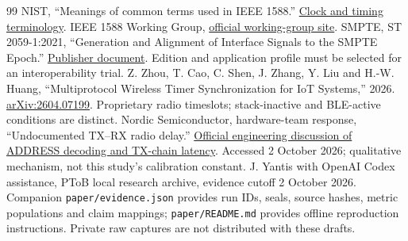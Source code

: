 \documentclass[11pt,letterpaper]{article}
\begin{document}
\begin{thebibliography}{99}
 NIST, ``Meanings of common terms used in IEEE 1588.'' \href{https://www.nist.gov/el/intelligent-systems-division-73500/meanings-common-terms-used-ieee-1588}{Clock and timing terminology}. IEEE 1588 Working Group, \href{https://sagroups.ieee.org/1588/}{official working-group site}.
 SMPTE, ST 2059-1:2021, ``Generation and Alignment of Interface Signals to the SMPTE Epoch.'' \href{https://pub.smpte.org/pub/st2059-1/st2059-1-2021.pdf}{Publisher document}. Edition and application profile must be selected for an interoperability trial.
 Z. Zhou, T. Cao, C. Shen, J. Zhang, Y. Liu and H.-W. Huang, ``Multiprotocol Wireless Timer Synchronization for IoT Systems,'' 2026. \href{https://doi.org/10.48550/arXiv.2604.07199}{arXiv:2604.07199}. Proprietary radio timeslots; stack-inactive and BLE-active conditions are distinct.
 Nordic Semiconductor, hardware-team response, ``Undocumented TX--RX radio delay.'' \href{https://devzone.nordicsemi.com/f/nordic-q-a/83778/undocumented-tx---rx-radio-delay/570863}{Official engineering discussion of ADDRESS decoding and TX-chain latency}. Accessed 2 October 2026; qualitative mechanism, not this study's calibration constant.
 J. Yantis with OpenAI Codex assistance, PToB local research archive, evidence cutoff 2 October 2026. Companion \texttt{paper/evidence.json} provides run IDs, seals, source hashes, metric populations and claim mappings; \texttt{paper/README.md} provides offline reproduction instructions. Private raw captures are not distributed with these drafts.
\end{thebibliography}
\end{document}
